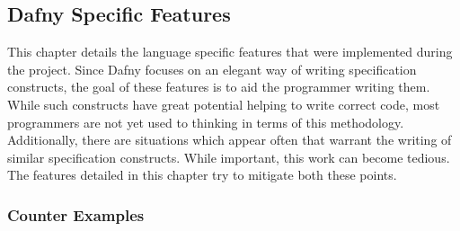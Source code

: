 \subsection{Dafny Specific Features}\label{dffeatures}
This chapter details the language specific features that were implemented during the project. Since Dafny focuses on an elegant way of writing specification constructs, the goal of these features is to aid the programmer writing them. While such constructs have great potential helping to write correct code, most programmers are not yet used to thinking in terms of this methodology. Additionally, there are situations which appear often that warrant the writing of similar specification constructs. While important, this work can become tedious. The features detailed in this chapter try to mitigate both these points. \newline
\subsubsection{Counter Examples}
